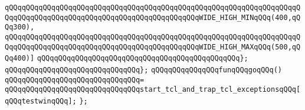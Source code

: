 \verb|qQQqqQQqqQQqqQQqqQQqqQQqqQQqqQQqqQQqqQQqqQQqqQQqqQQqqQQqqQQqqQQqqQQqqQQqqQQqqQQqqQQqqQQqqQQqqQQqqQQqqQQqqQQqqQQqqQQqWIDE_HIGH_MINqQQq(400,qQQq300),|\newline
\verb|qQQqqQQqqQQqqQQqqQQqqQQqqQQqqQQqqQQqqQQqqQQqqQQqqQQqqQQqqQQqqQQqqQQqqQQqqQQqqQQqqQQqqQQqqQQqqQQqqQQqqQQqqQQqqQQqqQQqWIDE_HIGH_MAXqQQq(500,qQQq400)]|\newline
\verb|qQQqqQQqqQQqqQQqqQQqqQQqqQQqqQQqqQQqqQQqqQQqqQQq};|\newline
\verb|qQQqqQQqqQQqqQQqqQQqqQQqqQQqqQQq};|\newline
\newline
\verb|qQQqqQQqqQQqqQQqfunqQQqgoqQQq()|\newline
\verb|qQQqqQQqqQQqqQQqqQQqqQQqqQQqqQQq=|\newline
\verb|qQQqqQQqqQQqqQQqqQQqqQQqqQQqqQQqstart_tcl_and_trap_tcl_exceptionsqQQq[qQQqtestwinqQQq];|\newline
\newline
\verb|};|\newline
\newline
\newline

